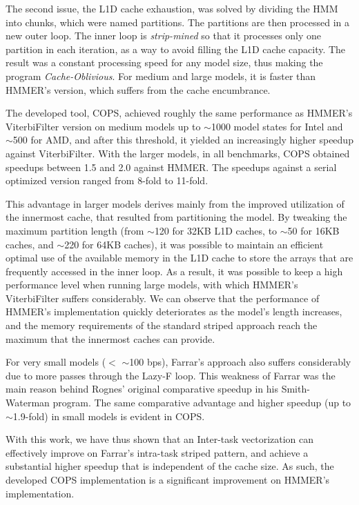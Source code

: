 The second issue, the L1D cache exhaustion, was solved by dividing the HMM into chunks, which were named partitions. The partitions are then processed in a new outer loop. The inner loop is \emph{strip-mined} so that it processes only one partition in each iteration, as a way to avoid filling the L1D cache capacity. The result was a constant processing speed for any model size, thus making the program \emph{Cache-Oblivious}. For medium and large models, it is faster than HMMER's version, which suffers from the cache encumbrance.


The developed tool, COPS, achieved roughly the same performance as HMMER's ViterbiFilter version on medium models up to $\sim$1000 model states for Intel and $\sim$500 for AMD, and after this threshold, it yielded an increasingly higher speedup against ViterbiFilter. With the larger models, in all benchmarks, COPS obtained speedups between 1.5 and 2.0 against HMMER. The speedups against a serial optimized version ranged from 8-fold to 11-fold.

This advantage in larger models derives mainly from the improved utilization of the innermost cache, that resulted from partitioning the model. By tweaking the maximum partition length (from $\sim$120 for 32KB L1D caches, to $\sim$50 for 16KB caches, and $\sim$220 for 64KB caches), it was possible to maintain an efficient optimal use of the available memory in the L1D cache to store the arrays that are frequently accessed in the inner loop. As a result, it was possible to keep a high performance level when running large models, with which HMMER's ViterbiFilter suffers considerably. We can observe that the performance of HMMER's implementation quickly deteriorates as the model's length increases, and the memory requirements of the standard striped approach reach the maximum that the innermost caches can provide.

For very small models ($<$ $\sim$100 bps), Farrar's approach also suffers considerably due to more passes through the Lazy-F loop. This weakness of Farrar was the main reason behind Rognes' original comparative speedup in his Smith-Waterman program. The same comparative advantage and higher speedup (up to $\sim$1.9-fold) in small models is evident in COPS. 


With this work, we have thus shown that an Inter-task vectorization can effectively improve on Farrar's intra-task striped pattern, and achieve a substantial higher speedup that is independent of the cache size. As such, the developed COPS implementation is a significant improvement on HMMER's implementation.

